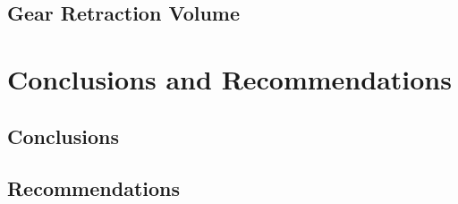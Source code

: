 \documentclass[conf]{new-aiaa}
\begin{document}
\subsection{Gear Retraction Volume}

\section{Conclusions and Recommendations}
\subsection{Conclusions}

\subsection{Recommendations}
\end{document}
